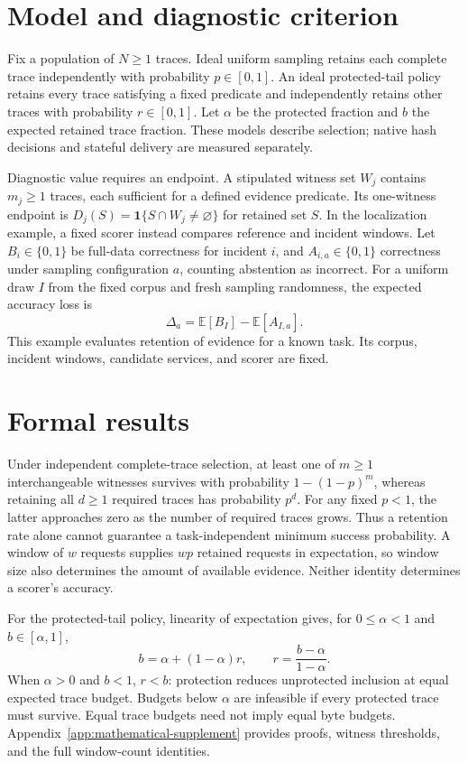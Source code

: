 \section{Model and diagnostic criterion}\label{sec:model}
Fix a population of $N\ge1$ traces. Ideal uniform sampling retains each complete trace independently with probability $p\in[0,1]$. An ideal protected-tail policy retains every trace satisfying a fixed predicate and independently retains other traces with probability $r\in[0,1]$. Let $\alpha$ be the protected fraction and $b$ the expected retained trace fraction. These models describe selection; native hash decisions and stateful delivery are measured separately.

Diagnostic value requires an endpoint. A stipulated witness set $W_j$ contains $m_j\ge1$ traces, each sufficient for a defined evidence predicate. Its one-witness endpoint is $D_j(S)=\mathbf1\{S\cap W_j\ne\varnothing\}$ for retained set $S$. In the localization example, a fixed scorer instead compares reference and incident windows. Let $B_i\in\{0,1\}$ be full-data correctness for incident $i$, and $A_{i,a}\in\{0,1\}$ correctness under sampling configuration $a$, counting abstention as incorrect. For a uniform draw $I$ from the fixed corpus and fresh sampling randomness, the expected accuracy loss is
\begin{equation}\label{eq:loss-target}
 \Delta_a=\mathbb E[B_I]-\mathbb E[A_{I,a}].
\end{equation}
This example evaluates retention of evidence for a known task. Its corpus, incident windows, candidate services, and scorer are fixed.

\section{Formal results}\label{sec:theory}
Under independent complete-trace selection, at least one of $m\ge1$ interchangeable witnesses survives with probability $1-(1-p)^m$, whereas retaining all $d\ge1$ required traces has probability $p^d$. For any fixed $p<1$, the latter approaches zero as the number of required traces grows. Thus a retention rate alone cannot guarantee a task-independent minimum success probability. A window of $w$ requests supplies $wp$ retained requests in expectation, so window size also determines the amount of available evidence. Neither identity determines a scorer's accuracy.

For the protected-tail policy, linearity of expectation gives, for $0\le\alpha<1$ and $b\in[\alpha,1]$,
\begin{equation}\label{eq:tailbudget}
 b=\alpha+(1-\alpha)r,\qquad r=\frac{b-\alpha}{1-\alpha}.
\end{equation}
When $\alpha>0$ and $b<1$, $r<b$: protection reduces unprotected inclusion at equal expected trace budget. Budgets below $\alpha$ are infeasible if every protected trace must survive. Equal trace budgets need not imply equal byte budgets. Appendix~\ref{app:mathematical-supplement} provides proofs, witness thresholds, and the full window-count identities.

